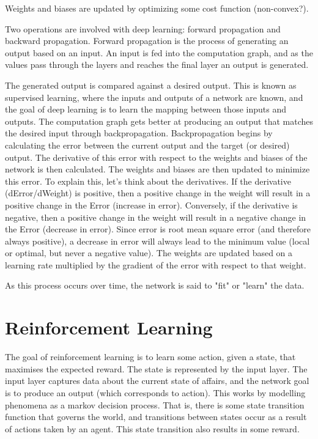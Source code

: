 Weights and biases are updated by optimizing some cost function (non-convex?).

Two operations are involved with deep learning: forward propagation and backward propagation. Forward propagation is the process of generating an output based on an input. An input is fed into the computation graph, and as the values pass through the layers and reaches the final layer an output is generated.

The generated output is compared against a desired output. This is known as supervised learning, where the inputs and outputs of a network are known, and the goal of deep learning is to learn the mapping between those inputs and outputs. The computation graph gets better at producing an output that matches the desired input through backpropagation. Backpropagation begins by calculating the error between the current output and the target (or desired) output. The derivative of this error with respect to the weights and biases of the network is then calculated. The weights and biases are then updated to minimize this error. To explain this, let's think about the derivatives. If the derivative (dError/dWeight) is positive, then a positive change in the weight will result in a positive change in the Error (increase in error). Conversely, if the derivative is negative, then a positive change in the weight will result in a negative change in the Error (decrease in error). Since error is root mean square error (and therefore always positive), a decrease in error will always lead to the minimum value (local or optimal, but never a negative value). The weights are updated based on a learning rate multiplied by the gradient of the error with respect to that weight. 

As this process occurs over time, the network is said to "fit" or "learn" the data.

\section{Reinforcement Learning}

The goal of reinforcement learning is to learn some action, given a state, that maximises the expected reward. The state is represented by the input layer. The input layer captures data about the current state of affairs, and the network goal is to produce an output (which corresponds to action). This works by modelling phenomena as a markov decision process. That is, there is some state transition function that governs the world, and transitions between states occur as a result of actions taken by an agent. This state transition also results in some reward.

